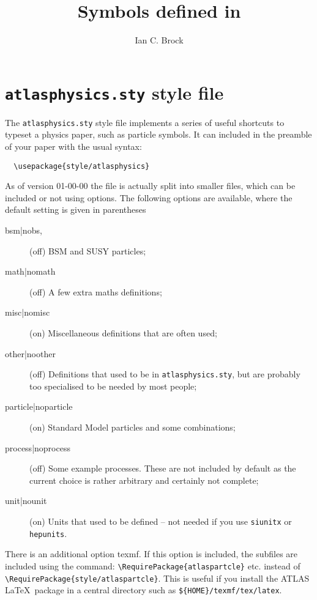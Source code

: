 \documentclass[UKenglish]{style/atlasdoc}
\title{Symbols defined in \File{atlasphysics.sty}}
\author{Ian C. Brock}
\affil{University of Bonn}
\newcommand{\File}[1]{\texttt{#1}\xspace}
\newcommand{\Option}[1]{\textsf{#1}\xspace}
\newcommand{\Package}[1]{\texttt{#1}\xspace}
\begin{document}
\tableofcontents

\section{\File{atlasphysics.sty} style file}
\label{sec:atlasphysics}

The \File{atlasphysics.sty} style file implements a series of useful
shortcuts to typeset a physics paper, such as particle
symbols. It can included in the preamble of your paper with the usual
syntax:
%
\begin{verbatim}
  \usepackage{style/atlasphysics}
\end{verbatim}
%
As of version 01-00-00 the file is actually split into smaller files,
which can be included or not using options.
The following options are available, where the default setting is given in parentheses
\begin{description}
\item[bsm|nobs,](off) BSM and SUSY particles;
\item[math|nomath] (off) A few extra maths definitions;
\item[misc|nomisc](on) Miscellaneous definitions that are often used;
\item[other|noother](off) Definitions that used to be in \File{atlasphysics.sty}, 
	but are probably too specialised to be needed by most people;
\item[particle|noparticle](on) Standard Model particles and some combinations;
\item[process|noprocess](off) Some example processes. 
	These are not included by default as the current choice is rather arbitrary
	and certainly not complete;
\item[unit|nounit](on) Units that used to be defined -- not needed if you use \Package{siunitx} or \Package{hepunits}.
\end{description}

There is an additional option \Option{texmf}.
If this option is included, the subfiles are included using the command:
\verb|\RequirePackage{atlaspartcle}| etc. instead of \verb|\RequirePackage{style/atlaspartcle}|.
This is useful if you install the ATLAS \LaTeX\ package in a central directory such as \File{\$\{HOME\}/texmf/tex/latex}.
\end{document}
